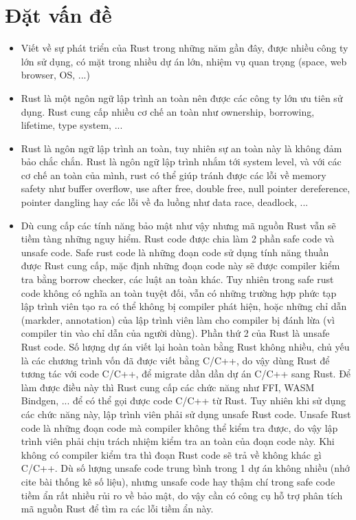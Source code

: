 \chapter{Đặt vấn đề}
\label{chap:introduction}

\begin{itemize}
    \item Viết về sự phát triển của Rust trong những năm gần đây, được nhiều công ty lớn sử dụng, có mặt trong nhiều dự án lớn, nhiệm vụ quan trọng (space, web browser, OS, ...)
    \item Rust là một ngôn ngữ lập trình an toàn nên được các công ty lớn ưu tiên sử dụng. Rust cung cấp nhiều cơ chế an toàn như ownership, borrowing, lifetime, type system, ...
    \item Rust là ngôn ngữ lập trình an toàn, tuy nhiên sự an toàn này là không đảm bảo chắc chắn. Rust là ngôn ngữ lập trình nhắm tới system level, và với các cơ chế an toàn của mình, rust có thể giúp tránh được các lỗi về memory safety như buffer overflow, use after free, double free, null pointer dereference, pointer dangling hay các lỗi về đa luồng như data race, deadlock, ...
    \item Dù cung cấp các tính năng bảo mật như vậy nhưng mã nguồn Rust vẫn sẽ tiềm tàng những nguy hiểm. Rust code được chia làm 2 phần safe code và unsafe code. Safe rust code là những đoạn code sử dụng tính năng thuần được Rust cung cấp, mặc định những đoạn code này sẽ được compiler kiểm tra bằng borrow checker, các luật an toàn khác. Tuy nhiên trong safe rust code không có nghĩa an toàn tuyệt đối, vẫn có những trường hợp phức tạp lập trình viên tạo ra có thể không bị compiler phát hiện, hoặc những chỉ dẫn (markder, annotation) của lập trình viên làm cho compiler bị đánh lừa (vì compiler tin vào chỉ dẫn của người dùng). Phần thứ 2 của Rust là unsafe Rust code. Số lượng dự án viết lại hoàn toàn bằng Rust không nhiều, chủ yếu là các chương trình vốn đã được viết bằng C/C++, do vậy dùng Rust để tương tác với code C/C++, để migrate dần dần dự án C/C++ sang Rust. Để làm được điều này thì Rust cung cấp các chức năng như FFI, WASM Bindgen, ... để có thể gọi được code C/C++ từ Rust. Tuy nhiên khi sử dụng các chức năng này, lập trình viên phải sử dụng unsafe Rust code. Unsafe Rust code là những đoạn code mà compiler không thể kiểm tra được, do vậy lập trình viên phải chịu trách nhiệm kiểm tra an toàn của đoạn code này. Khi không có compiler kiểm tra thì đoạn Rust code sẽ trả về không khác gì C/C++. Dù số lượng unsafe code trung bình trong 1 dự án không nhiều (nhớ cite bài thống kê số liệu), nhưng unsafe code hay thậm chí trong safe code tiềm ẩn rất nhiều rủi ro về bảo mật, do vậy cần có công cụ hỗ trợ phân tích mã nguồn Rust để tìm ra các lỗi tiềm ẩn này.

\end{itemize}
